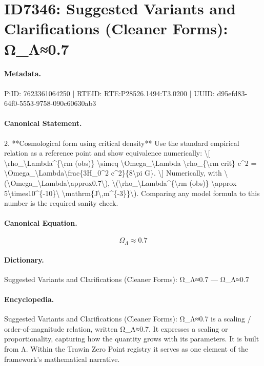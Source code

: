 \section*{ID7346: Suggested Variants and Clarifications (Cleaner Forms): Ω\_Λ≈0.7}
\paragraph{Metadata.}
PiID: 7623361064250 | RTEID: RTE:P28526.1494:T3.0200 | UUID: d95efd83-64f0-5553-9758-090c60630ab3

\paragraph{Canonical Statement.}
2. **Cosmological form using critical density** Use the standard empirical relation as a reference point and show equivalence numerically: \textbackslash{}[ \textbackslash{}rho\_\textbackslash{}Lambda\textasciicircum{}\{\textbackslash{}rm (obs)\} \textbackslash{}simeq \textbackslash{}Omega\_\textbackslash{}Lambda \textbackslash{}rho\_\{\textbackslash{}rm crit\} c\textasciicircum{}2 = \textbackslash{}Omega\_\textbackslash{}Lambda\textbackslash{}frac\{3H\_0\textasciicircum{}2 c\textasciicircum{}2\}\{8\textbackslash{}pi G\}. \textbackslash{}] Numerically, with \textbackslash{}(\textbackslash{}Omega\_\textbackslash{}Lambda\textbackslash{}approx0.7\textbackslash{}), \textbackslash{}(\textbackslash{}rho\_\textbackslash{}Lambda\textasciicircum{}\{\textbackslash{}rm (obs)\} \textbackslash{}approx 5\textbackslash{}times10\textasciicircum{}\{-10\}\textbackslash{} \textbackslash{}mathrm\{J\textbackslash{},m\textasciicircum{}\{-3\}\}\textbackslash{}). Comparing any model formula to this number is the required sanity check.

\paragraph{Canonical Equation.}
\[
\Omega_\Lambda\approx0.7
\]

\paragraph{Dictionary.}
Suggested Variants and Clarifications (Cleaner Forms): Ω\_Λ≈0.7 — Ω\_Λ≈0.7

\paragraph{Encyclopedia.}
Suggested Variants and Clarifications (Cleaner Forms): Ω\_Λ≈0.7 is a scaling / order-of-magnitude relation, written Ω\_Λ≈0.7. It expresses a scaling or proportionality, capturing how the quantity grows with its parameters. It is built from Λ. Within the Trawin Zero Point registry it serves as one element of the framework's mathematical narrative.
